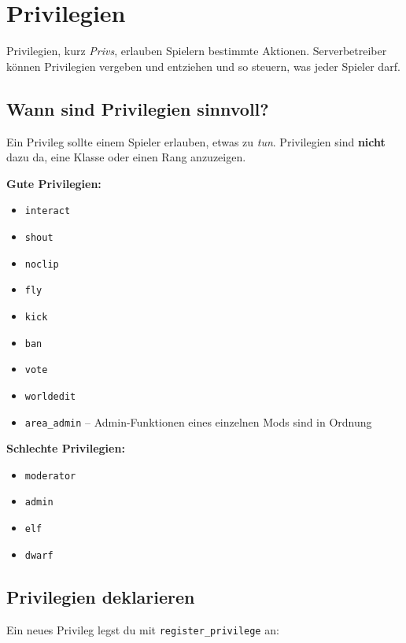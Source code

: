 \chapter{Privilegien}
\label{ch:players/privileges}

Privilegien, kurz \emph{Privs}, erlauben
Spielern bestimmte Aktionen. Serverbetreiber können Privilegien vergeben
und entziehen und so steuern, was jeder Spieler darf.

\section{Wann sind Privilegien
sinnvoll?}\label{wann-sind-privilegien-sinnvoll}

Ein Privileg sollte einem Spieler erlauben, etwas zu \emph{tun}.
Privilegien sind \textbf{nicht} dazu da, eine Klasse oder einen Rang
anzuzeigen.

\textbf{Gute Privilegien:}

\begin{itemize}
\tightlist
\item
  \texttt{interact}
\item
  \texttt{shout}
\item
  \texttt{noclip}
\item
  \texttt{fly}
\item
  \texttt{kick}
\item
  \texttt{ban}
\item
  \texttt{vote}
\item
  \texttt{worldedit}
\item
  \texttt{area\_\allowbreak{}admin} -- Admin-Funktionen eines einzelnen
  Mods sind in Ordnung
\end{itemize}

\textbf{Schlechte Privilegien:}

\begin{itemize}
\tightlist
\item
  \texttt{moderator}
\item
  \texttt{admin}
\item
  \texttt{elf}
\item
  \texttt{dwarf}
\end{itemize}

\section{Privilegien deklarieren}\label{privilegien-deklarieren}

Ein neues Privileg legst du mit
\texttt{register\_\allowbreak{}privilege} an:


